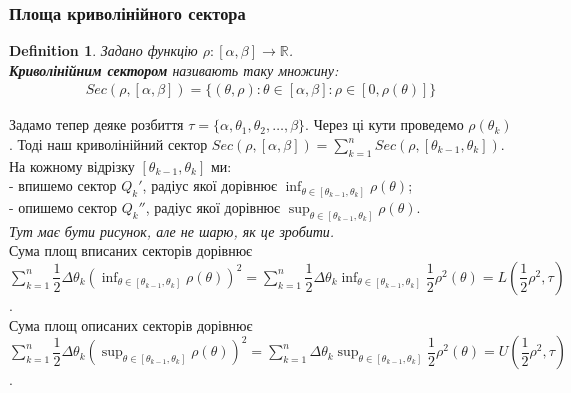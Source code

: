 \documentclass[a4paper, 10pt]{article}
\def\huge{\displaystyle}
\theoremstyle{theoremdd}
\theoremstyle{theoremdd}
\newtheorem{definition}[theorem]{Definition}
\theoremstyle{theoremdd}
\theoremstyle{theoremdd}
\theoremstyle{theoremdd}
\theoremstyle{theoremdd}
\theoremstyle{theoremdd}
\theoremstyle{theoremdd}
\begin{document}
\subsubsection{Площа криволінійного сектора}
\begin{definition}
Задано функцію $\rho: [\alpha, \beta] \to \mathbb{R}$.\\
\textbf{Криволінійним сектором} називають таку множину:
\begin{align*}
Sec(\rho,[\alpha,\beta]) = \{(\theta,\rho) : \theta \in [\alpha,\beta]: \rho \in [0,\rho(\theta)] \}
\end{align*}
\begin{figure}[H]
\centering
{}
\end{figure}
\end{definition}
Задамо тепер деяке розбиття $\tau = \{\alpha, \theta_1,\theta_2,\dots,\beta \}$. Через ці кути проведемо $\rho(\theta_k)$. Тоді наш криволінійний сектор $Sec(\rho,[\alpha,\beta]) =\huge\sum_{k=1}^n Sec(\rho, [\theta_{k-1}, \theta_k])$.\\
На кожному відрізку $[\theta_{k-1}, \theta_k]$ ми:\\
- впишемо сектор $Q_k'$, радіус якої дорівнює $\huge\inf_{\theta \in [\theta_{k-1}, \theta_k]} \rho(\theta)$;\\
- опишемо сектор $Q_k''$, радіус якої дорівнює $\huge\sup_{\theta \in [\theta_{k-1}, \theta_k]} \rho(\theta)$.\\
\textit{Тут має бути рисунок, але не шарю, як це зробити.}\\
Сума площ вписаних секторів дорівнює $\huge\sum_{k=1}^n \dfrac{1}{2} \Delta \theta_k \huge \left(\inf_{\theta \in [\theta_{k-1}, \theta_k]} \rho(\theta) \right)^2 = \huge\sum_{k=1}^n \dfrac{1}{2} \Delta \theta_k \huge \inf_{\theta \in [\theta_{k-1}, \theta_k]} \dfrac{1}{2} \rho^2(\theta) = L \left( \dfrac{1}{2} \rho^2, \tau \right)$.\\
Сума площ описаних секторів дорівнює $\huge\sum_{k=1}^n \dfrac{1}{2} \Delta \theta_k \huge \left(\sup_{\theta \in [\theta_{k-1}, \theta_k]} \rho(\theta) \right)^2 = \huge\sum_{k=1}^n \Delta \theta_k \huge \sup_{\theta \in [\theta_{k-1}, \theta_k]} \dfrac{1}{2} \rho^2(\theta) = U \left( \dfrac{1}{2} \rho^2, \tau \right)$.
\end{document}
